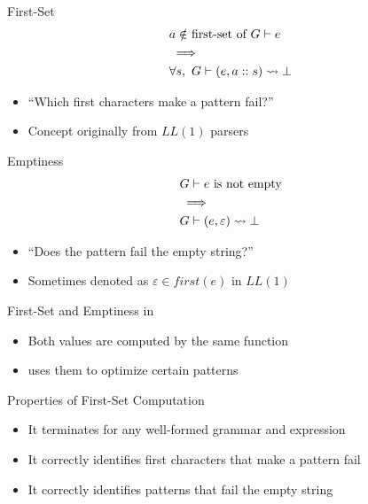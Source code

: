 \documentclass{beamer}
\begin{document}
\begin{frame}{First-Set}
    \begin{align*}
        & \text{$a \notin$ first-set of $G \vdash e$} \\
        & \implies \\
        & \forall s,\ G \vdash (e, a::s) \rightsquigarrow \bot
    \end{align*}
    \begin{itemize}
        \item ``Which first characters make a pattern fail?''
        \item Concept originally from $LL(1)$ parsers
    \end{itemize}
\end{frame}

\begin{frame}{Emptiness}
    \begin{align*}
        & \text{$G \vdash e$ is not empty} \\
        & \implies \\
        & G \vdash (e, \varepsilon) \rightsquigarrow \bot
    \end{align*}
    \begin{itemize}
        \item ``Does the pattern fail the empty string?''
        \item Sometimes denoted as $\varepsilon \in first(e)$ in $LL(1)$
    \end{itemize}
\end{frame}

\begin{frame}{First-Set and Emptiness in \lpeg{}}
    \begin{itemize}
        \item Both values are computed by the same function
        \item \lpeg{} uses them to optimize certain patterns
    \end{itemize}
\end{frame}

\begin{frame}{Properties of First-Set Computation}
    \begin{itemize}
        \item It terminates for any well-formed grammar and expression
        \item It correctly identifies first characters that make a pattern fail
        \item It correctly identifies patterns that fail the empty string
    \end{itemize}
\end{frame}
\end{document}
